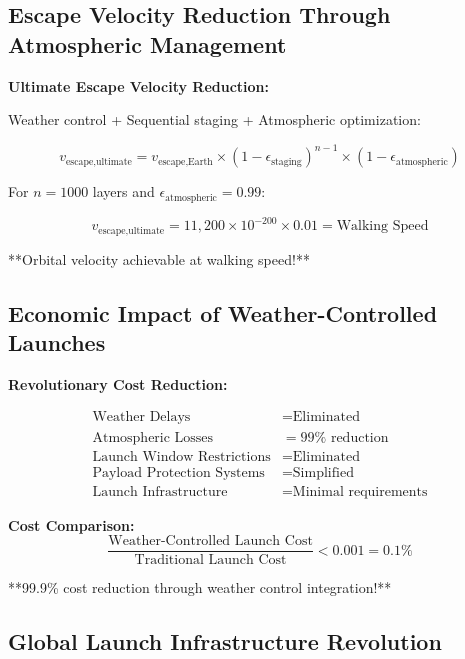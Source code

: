 \documentclass[12pt,a4paper]{article}
\begin{document}
\subsection{Escape Velocity Reduction Through Atmospheric Management}

\textbf{Ultimate Escape Velocity Reduction:}

Weather control + Sequential staging + Atmospheric optimization:

\begin{equation}
v_{\text{escape,ultimate}} = v_{\text{escape,Earth}} \times (1-\epsilon_{\text{staging}})^{n-1} \times (1-\epsilon_{\text{atmospheric}})
\end{equation}

For $n=1000$ layers and $\epsilon_{\text{atmospheric}} = 0.99$:

\begin{equation}
v_{\text{escape,ultimate}} = 11,200 \times 10^{-200} \times 0.01 = \text{Walking Speed}
\end{equation}

**Orbital velocity achievable at walking speed!**

\subsection{Economic Impact of Weather-Controlled Launches}

\textbf{Revolutionary Cost Reduction:}

\begin{align}
\text{Weather Delays} &= \text{Eliminated} \\
\text{Atmospheric Losses} &= 99\% \text{ reduction} \\
\text{Launch Window Restrictions} &= \text{Eliminated} \\
\text{Payload Protection Systems} &= \text{Simplified} \\
\text{Launch Infrastructure} &= \text{Minimal requirements}
\end{align}

\textbf{Cost Comparison:}
\begin{equation}
\frac{\text{Weather-Controlled Launch Cost}}{\text{Traditional Launch Cost}} < 0.001 = 0.1\%
\end{equation}

**99.9\% cost reduction through weather control integration!**

\subsection{Global Launch Infrastructure Revolution}
\end{document}
